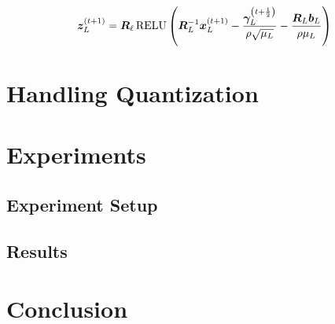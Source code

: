 \begin{equation}
\bm{z}_L^{(t + 1)} = \bm{R}_{\ell}\operatorname{RELU}\left(\bm{R}_L^{-1}\bm{x}_L^{(t + 1)} - \frac{\bm{\gamma}_L^{\left(t + \frac{1}{2}\right)}}{\rho\sqrt{\mu_L}} - \frac{\bm{R}_L\bm{b}_L}{\rho\mu_L}\right)
\end{equation}


\section{Handling Quantization}
\section{Experiments}
\subsection{Experiment Setup}
\subsection{Results}
\section{Conclusion}
